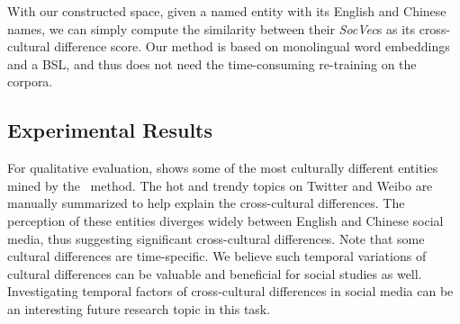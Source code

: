With our constructed \textbf{\textit{\socvec}} space, given a named entity with its English and Chinese names, we can simply compute the similarity between their \textit{SocVec}s as its cross-cultural difference score. 
Our method is based on monolingual word embeddings and a BSL, and thus does not need the time-consuming re-training on the corpora. 


\subsection{Experimental Results}

For qualitative evaluation,  shows some of 
the most culturally different entities mined by the \socvec\ method. 
The hot and trendy topics on Twitter and Weibo are 
manually summarized to help explain the cross-cultural differences. 
The perception of these entities diverges widely between English and
Chinese social media, thus suggesting
significant cross-cultural differences.
{Note that some cultural differences are time-specific. We believe such temporal variations of cultural differences can be valuable and beneficial for social studies as well. Investigating temporal factors of cross-cultural differences in social media can be an interesting future research topic in this task.}


